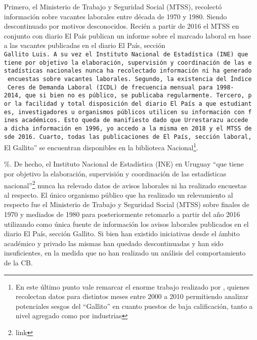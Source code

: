 \documentclass[msc,oneside,a4paper]{udelar} %
\begin{document}
  Primero, el Ministerio de Trabajo y Seguridad Social (MTSS), recolectó información sobre vacantes laborales entre década de 1970 y 1980. Siendo descontinuado por motivos desconocidos. Recién a partir de 2016 el MTSS en conjunto con diario El País publican un informe sobre el marcado laboral en base a las vacantes publicadas en el diario El País, sección \texttt{Gallito\ Luis\textquotesingle{}\textquotesingle{}.\ A\ su\ vez\ el\ Instituto\ Nacional\ de\ Estadística\ (INE)\ que\ tiene\ por\ objetivo\ la\ elaboración,\ supervisión\ y\ coordinación\ de\ las\ estadísticas\ nacionales\ nunca\ ha\ recolectado\ información\ ni\ ha\ generado\ encuestas\ sobre\ vacantes\ laborales.\ Segundo,\ la\ existencia\ del\ Índice\ Ceres\ de\ Demanda\ Laboral\ (ICDL)\ de\ frecuencia\ mensual\ para\ 1998-2014,\ que\ si\ bien\ no\ es\ público,\ se\ publicaba\ regularmente.\ Tercero,\ por\ la\ facilidad\ y\ total\ disposición\ del\ diario\ El\ País\ a\ que\ estudiantes,\ investigadores\ u\ organismos\ públicos\ utilicen\ su\ información\ con\ fines\ académicos.\ Esto\ queda\ de\ manifiesto\ dado\ que\ Urrestarazu\ accede\ a\ dicha\ información\ en\ 1996,\ yo\ accedo\ a\ la\ misma\ en\ 2018\ y\ el\ MTSS\ desde\ 2016.\ Cuarto,\ todas\ las\ publicaciones\ de\ El\ País,\ sección\ laboral,}El Gallito'' se encuentran disponibles en la biblioteca Nacional\footnote{En este último punto vale remarcar el enorme trabajo realizado por \cite{Alma2011}, quienes recolectan datos para distintos meses entre 2000 a 2010 permitiendo analizar potenciales sesgos del ``Gallito'' en cuanto puestos de baja calificación, tanto a nivel agregado como por industrias}.
  
  \%. De hecho, el Instituto Nacional de Estadística (INE) en Uruguay ``que tiene por objetivo la elaboración, supervisión y coordinación de las estadísticas nacional''\footnote{link} nunca ha relevado datos de avisos laborales ni ha realizado encuestas al respecto. El único organismo público que ha realizado un relevamiento al respecto fue el Ministerio de Trabajo y Seguridad Social (MTSS) sobre finales de 1970 y mediados de 1980 para posteriormente retomarlo a partir del año 2016 utilizando como única fuente de información los avisos laborales publicados en el diario El País, sección Gallito. Si bien han existido iniciativas desde el ámbito académico\cite{Alma2011} y privado\cite{Ceres2012} las mismas han quedado descontinuadas y han sido insuficientes, en la medida que no han realizado un análisis del comportamiento de la CB.
  
\end{document}
